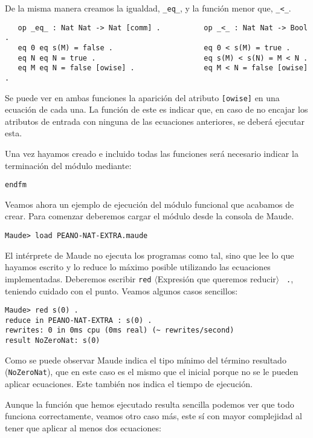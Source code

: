 De la misma manera creamos la igualdad, \verb"_eq_", y la función menor que, \verb"_<_".\par

{\codesize
\begin{verbatim}
   op _eq_ : Nat Nat -> Nat [comm] .          op _<_ : Nat Nat -> Bool .
   eq 0 eq s(M) = false .                     eq 0 < s(M) = true .
   eq N eq N = true .                         eq s(M) < s(N) = M < N .
   eq M eq N = false [owise] .                eq M < N = false [owise] .
\end{verbatim}
}
Se puede ver en ambas funciones la aparición del atributo \verb"[owise]" en una ecuación de cada una. La función de este es indicar que, en caso de no encajar los atributos de entrada con ninguna de las ecuaciones anteriores, se deberá ejecutar esta. \par

Una vez hayamos creado e incluido todas las funciones será necesario indicar la terminación del módulo mediante: \par

{\codesize
\begin{verbatim}
endfm
\end{verbatim}
}

Veamos ahora un ejemplo de ejecución del módulo funcional que acabamos de crear. Para comenzar deberemos cargar el módulo desde la consola de Maude.\par

{\codesize
\begin{verbatim}
Maude> load PEANO-NAT-EXTRA.maude
\end{verbatim}
}

El intérprete de Maude no ejecuta los programas como tal, sino que lee lo que hayamos escrito y lo reduce lo máximo posible utilizando las ecuaciones implementadas. Deberemos escribir \texttt{red} $\langle$Expresión que queremos reducir$\rangle$ \verb" .", teniendo cuidado con el punto. Veamos algunos casos sencillos:
{\codesize
\begin{verbatim}
Maude> red s(0) .
reduce in PEANO-NAT-EXTRA : s(0) .
rewrites: 0 in 0ms cpu (0ms real) (~ rewrites/second)
result NoZeroNat: s(0)
\end{verbatim}
}
\noindent Como se puede observar Maude indica el tipo mínimo del término resultado (\texttt{NoZeroNat}), que en este caso es el mismo que el inicial porque no se le pueden aplicar ecuaciones. Este también nos indica el tiempo de ejecución.

Aunque la función que hemos ejecutado resulta sencilla podemos ver que todo funciona correctamente, veamos otro caso más, este sí con mayor complejidad al tener que aplicar al menos dos ecuaciones:\par

